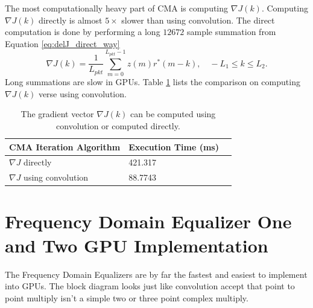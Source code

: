 The most computationally heavy part of CMA is computing $\nabla J(k)$.
Computing $\nabla J(k)$ directly is almost $5\times$ slower than using convolution.
The direct computation is done by performing a long $12672$ sample summation from Equation \eqref{eq:delJ_direct_way}
\begin{equation}
\nabla J(k) = \frac{1}{L_{pkt}} \sum^{L_{pkt}-1}_{m=0}  z(m) r^\ast(m-k), \quad -L_1 \leq k \leq L_2.
\end{equation}
Long summations are slow in GPUs.
Table \ref{tab:CMAtimingComparison} lists the comparison on computing $\nabla J(k)$ verse using convolution.
\begin{table}
\caption{The gradient vector $\nabla J(k)$ can be computed using convolution or computed directly.}
\begin{center}
\begin{tabular}{lll}
	\toprule
	CMA	Iteration Algorithm			& Execution Time (ms)	\\ \midrule
	$\nabla J$ directly 			& 421.317				\\
	$\nabla J$ using convolution & 88.7743				\\
	\bottomrule
\end{tabular}
\end{center}
\label{tab:CMAtimingComparison}
\end{table}



\section{Frequency Domain Equalizer One and Two GPU Implementation}
The Frequency Domain Equalizers are by far the fastest and easiest to implement into GPUs.
The block diagram looks just like convolution accept that point to point multiply isn't a simple two or three point complex multiply.

